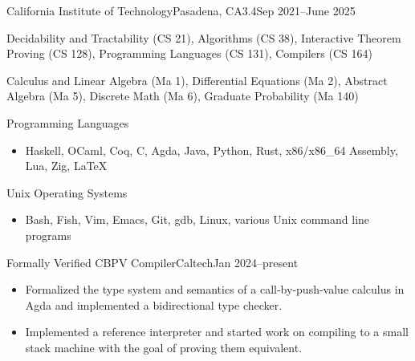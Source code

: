\documentclass[a4paper]{article}
\begin{document}

    \begin{school}{California Institute of Technology}{Pasadena, CA}{3.4}{Sep 2021--June 2025}
        \item Decidability and Tractability (CS 21), Algorithms (CS 38), Interactive Theorem Proving (CS 128), Programming Languages (CS 131), Compilers (CS 164)
        \item Calculus and Linear Algebra (Ma 1), Differential Equations (Ma 2), Abstract Algebra (Ma 5), Discrete Math (Ma 6), Graduate Probability (Ma 140)
    \end{school}


    \begin{skill}{Programming Languages}
      \begin{itemize}[nosep]
        \item Haskell, OCaml, Coq, C, Agda, Java, Python, Rust, x86/x86\_64 Assembly, Lua, Zig, \LaTeX{}
      \end{itemize}
    \end{skill}
    \vspace{-8pt}
    \begin{skill}{Unix Operating Systems}
      \begin{itemize}[nosep]
        \item Bash, Fish, Vim, Emacs, Git, gdb, Linux, various Unix command line programs
     \end{itemize}
    \end{skill}
    \vspace{-5pt}

    \begin{activity*}{Formally Verified CBPV Compiler}{Caltech}{Jan 2024--present}
      \begin{itemize}[topsep=5pt, partopsep=0pt, itemsep=-1pt]
        \item Formalized the type system and semantics of a call-by-push-value calculus in Agda and implemented a bidirectional type checker.
        \item Implemented a reference interpreter and started work on compiling to a small stack machine with the goal of proving them equivalent.
      \end{itemize}
    \end{activity*}
\end{document}
